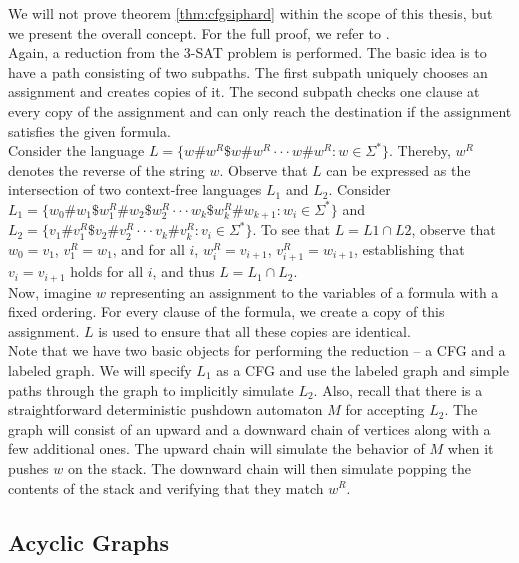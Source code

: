 \documentclass[]{article}
\numberwithin{equation}{section}
\begin{document}
We will not prove theorem \ref{thm:cfgsiphard} within the scope of this thesis, but we present the overall concept. For the full proof, we refer to \cite{BJM00}.\\

Again, a reduction from the 3-SAT problem is performed. The basic idea is to have a path consisting of two subpaths. The first subpath uniquely chooses an assignment and creates copies of it. The second subpath checks one clause at every copy of the assignment and can only reach the destination if the assignment satisfies the given formula.\\

Consider the language $L = \{w\#w^R\$w\#w^R\cdot\cdot\cdot w\#w^R:w\in\Sigma^*\}$. Thereby, $w^R$ denotes the reverse of the string $w$. Observe that $L$ can be expressed as the intersection of two context-free languages $L_1$ and $L_2$. Consider $L_1 = \{w_0\#w_1\$w_1^R\#w_2\$w_2^R\cdot\cdot\cdot w_k\$w_k^R\#w_{k+1}:w_i\in\Sigma^*\}$ and $L_2 = \{ v_1\#v_1^R\$v_2\#v_2^R\cdot\cdot\cdot v_k\#v_k^R: v_i\in\Sigma^*\}$. To see that $L = L1 \cap L2$, observe that $w_0 = v_1$, $v_1^R = w_1$, and for all $i$, $w_i^R = v_{i+1}$, $v_{i+1}^R = w_{i+1}$, establishing that $v_i = v_{i+1}$ holds for all $i$, and thus $L = L_1 \cap L_2$.\\

Now, imagine $w$ representing an assignment to the variables of a formula with a fixed ordering. For every clause of the formula, we create a copy of this assignment. $L$ is used to ensure that all these copies are identical.\\

Note that we have two basic objects for performing the reduction -- a CFG and a labeled graph. We will specify $L_1$ as a CFG and use the labeled graph and simple paths through the graph to implicitly simulate $L_2$. Also, recall that there is a straightforward deterministic pushdown automaton $M$ for accepting $L_2$. The graph will consist of an upward and a downward chain of vertices along with a few additional ones. The upward chain will simulate the behavior of $M$ when it pushes $w$ on the stack. The downward chain will then simulate popping the contents of the stack and verifying that they match $w^R$.

\subsection{Acyclic Graphs}
\label{sec:sip:acyclic}
\end{document}

